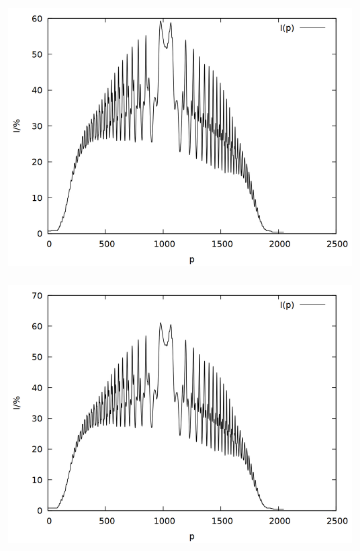 \begin{figure}
\begin{subfigure}{0.45\textwidth}
\includegraphics[width=\textwidth]{data/zeeman/out_6_6_raw.png}
\end{subfigure}
\begin{subfigure}{0.45\textwidth}
\includegraphics[width=\textwidth]{data/zeeman/out_6_9_raw.png}
\end{subfigure}
\begin{subfigure}{0.45\textwidth}

\end{subfigure}
\end{figure}
